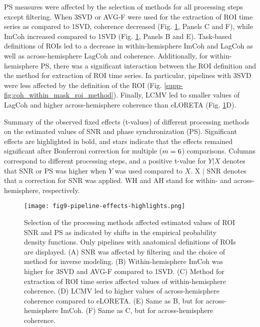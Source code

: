 \medskip

PS measures were affected by the selection of methods for all processing steps except filtering. When 3SVD or AVG-F were used for the extraction of ROI time series as compared to 1SVD, coherence decreased (Fig. \ref{fig:pipeline_effects_highlights}, Panels C and F), while ImCoh increased compared to 1SVD (Fig. \ref{fig:pipeline_effects_highlights}, Panels B and E). Task-based definitions of ROIs led to a decrease in within-hemisphere ImCoh and LagCoh as well as across-hemisphere LagCoh and coherence. Additionally, for within-hemisphere PS, there was a significant interaction between the ROI definition and the method for extraction of ROI time series. In particular, pipelines with 3SVD were less affected by the definition of the ROI (Fig. \ref{supp-fig:coh_within_mask_roi_method}). Finally, LCMV led to smaller values of LagCoh and higher across-hemisphere coherence than eLORETA (Fig. \ref{fig:pipeline_effects_highlights}D).

\begin{table}[htbp]
    \small
    \centering
    \resizebox{\linewidth}{!}{\pipelineEffectsSummary}
    \caption{Summary of the observed fixed effects (t-values) of different processing methods on the estimated values of SNR and phase synchronization (PS). Significant effects are highlighted in bold, and stars indicate that the effects remained significant after Bonferroni correction for multiple ($m = 6$) comparisons. Columns correspond to different processing steps, and a positive t-value for $Y | X$ denotes that SNR or PS was higher when $Y$ was used compared to $X$. X $|$ SNR denotes that a correction for SNR was applied. WH and AH stand for within- and across-hemisphere, respectively.}
    \label{tab:pipeline_effects_summary}
\end{table}

\begin{figure}[htbp]
    \centering
    \texttt{[image: fig9-pipeline-effects-highlights.png]}
    \caption{Selection of the processing methods affected estimated values of ROI SNR and PS as indicated by shifts in the empirical probability density functions. Only pipelines with anatomical definitions of ROIs are displayed. (A) SNR was affected by filtering and the choice of method for inverse modeling. (B) Within-hemisphere ImCoh was higher for 3SVD and AVG-F compared to 1SVD. (C) Method for extraction of ROI time series affected values of within-hemisphere coherence. (D) LCMV led to higher values of across-hemisphere coherence compared to eLORETA. (E) Same as B, but for across-hemisphere ImCoh. (F) Same as C, but for across-hemisphere coherence.}
    \label{fig:pipeline_effects_highlights}
\end{figure}
